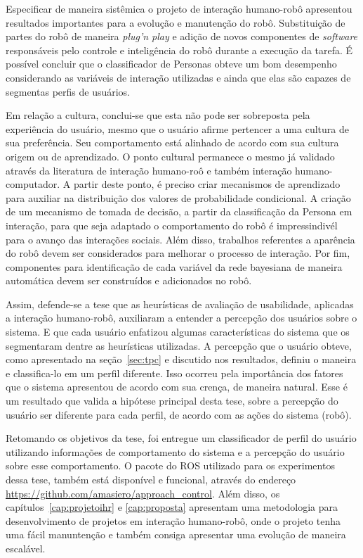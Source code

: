 Especificar de maneira sistêmica o projeto de interação humano-robô apresentou resultados importantes para a evolução e manutenção do robô. Substituição de partes do robô de maneira \emph{plug'n play} e adição de novos componentes de \emph{software} responsáveis pelo controle e inteligência do robô durante a execução da tarefa. É possível concluir que o classificador de Personas obteve um bom desempenho considerando as variáveis de interação utilizadas e ainda que elas são capazes de segmentas perfis de usuários.

Em relação a cultura, conclui-se que esta não pode ser sobreposta pela experiência do usuário, mesmo que o usuário afirme pertencer a uma cultura de sua preferência. Seu comportamento está alinhado de acordo com sua cultura origem ou de aprendizado. O ponto cultural permanece o mesmo já validado através da literatura de interação humano-roô e também interação humano-computador. A partir deste ponto, é preciso criar mecanismos de aprendizado para auxiliar na distribuição dos valores de probabilidade condicional. A criação de um mecanismo de tomada de decisão, a partir da classificação da Persona em interação, para que seja adaptado o comportamento do robô é impressindivél para o avanço das interações sociais. Além disso, trabalhos referentes a aparência do robô devem ser considerados para melhorar o processo de interação. Por fim, componentes para identificação de cada variável da rede bayesiana de maneira automática devem ser construídos e adicionados no robô.

Assim, defende-se a tese que as heurísticas de avaliação de usabilidade, aplicadas a interação humano-robô, auxiliaram a entender a percepção dos usuários sobre o sistema. E que cada usuário enfatizou algumas características do sistema que os segmentaram dentre as heurísticas utilizadas. A percepção que o usuário obteve, como apresentado na seção~\ref{sec:tpc} e discutido nos resultados, definiu o maneira e classifica-lo em um perfil diferente. Isso ocorreu pela importância dos fatores que o sistema apresentou de acordo com sua crença, de maneira natural. Esse é um resultado que valida a hipótese principal desta tese, sobre a percepção do usuário ser diferente para cada perfil, de acordo com as ações do sistema (robô).

Retomando os objetivos da tese, foi entregue um classificador de perfil do usuário utilizando informações de comportamento do sistema e a percepção do usuário sobre esse comportamento. O pacote do ROS utilizado para os experimentos dessa tese, também está disponível e funcional, através do endereço \url{https://github.com/amasiero/approach\_control}. Além disso, os capítulos~\ref{cap:projetoihr} e \ref{cap:proposta} apresentam uma metodologia para desenvolvimento de projetos em interação humano-robô, onde o projeto tenha uma fácil manuntenção e também consiga apresentar uma evolução de maneira escalável.

